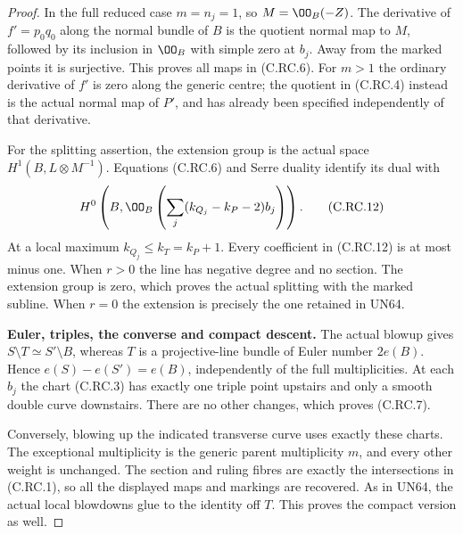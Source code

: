 \begin{proof}
In the full reduced case
$m=n_j=1$, so $M=\OO_B(-Z)$.
The derivative of
$f'=p_0q_0$ along the
normal bundle of $B$
is the quotient normal
map to $M$, followed by
its inclusion in $\OO_B$
with simple zero at $b_j$.
Away from the marked
points it is surjective.
This proves all maps in
(C.RC.6). For $m>1$ the
ordinary derivative of
$f'$ is zero along the
generic centre; the
quotient in (C.RC.4)
instead is the actual
normal map of $P'$,
and has already been
specified independently
of that derivative.

For the splitting assertion,
the extension group is the
actual space $H^1(B,L\otimes
M^{-1})$. Equations (C.RC.6)
and Serre duality identify
its dual with
\[
 H^0\left(B,\OO_B\left(
                   \sum_j(k_{Q_j}-k_P-2)b_j\right)\right).
\tag{C.RC.12}
\]
At a local maximum
$k_{Q_j}\le k_T=k_P+1$.
Every coefficient in
(C.RC.12) is at most
minus one. When $r>0$
the line has negative
degree and no section.
The extension group is
zero, which proves the
actual splitting with
the marked subline.
When $r=0$ the extension
is precisely the one
retained in UN64.

\par\medskip\noindent\textbf{Euler, triples, the converse and compact descent.}
The actual blowup gives
$S\setminus T\simeq S'\setminus B$,
whereas $T$ is a
projective-line bundle
of Euler number $2e(B)$.
Hence $e(S)-e(S')=e(B)$,
independently of the
full multiplicities.
At each $b_j$ the chart
(C.RC.3) has exactly one
triple point upstairs
and only a smooth double
curve downstairs. There
are no other changes,
which proves (C.RC.7).

Conversely, blowing up the
indicated transverse curve
uses exactly these charts.
The exceptional multiplicity
is the generic parent
multiplicity $m$, and
every other weight is
unchanged. The section
and ruling fibres are
exactly the intersections
in (C.RC.1), so all
the displayed maps and
markings are recovered.
As in UN64, the actual
local blowdowns glue to
the identity off $T$.
This proves the compact
version as well.
\end{proof}
